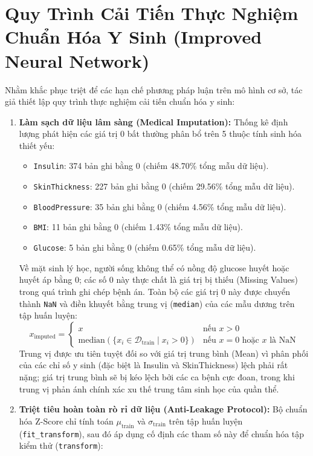 \documentclass[12pt,a4paper]{report}
\begin{document}
\section{Quy Trình Cải Tiến Thực Nghiệm Chuẩn Hóa Y Sinh (Improved Neural Network)}
Nhằm khắc phục triệt để các hạn chế phương pháp luận trên mô hình cơ sở, tác giả thiết lập quy trình thực nghiệm cải tiến chuẩn hóa y sinh:
\begin{enumerate}
    \item \textbf{Làm sạch dữ liệu lâm sàng (Medical Imputation):} Thống kê định lượng phát hiện các giá trị 0 bất thường phân bổ trên 5 thuộc tính sinh hóa thiết yếu:
    \begin{itemize}
        \item \texttt{Insulin}: 374 bản ghi bằng 0 (chiếm 48.70\% tổng mẫu dữ liệu).
        \item \texttt{SkinThickness}: 227 bản ghi bằng 0 (chiếm 29.56\% tổng mẫu dữ liệu).
        \item \texttt{BloodPressure}: 35 bản ghi bằng 0 (chiếm 4.56\% tổng mẫu dữ liệu).
        \item \texttt{BMI}: 11 bản ghi bằng 0 (chiếm 1.43\% tổng mẫu dữ liệu).
        \item \texttt{Glucose}: 5 bản ghi bằng 0 (chiếm 0.65\% tổng mẫu dữ liệu).
    \end{itemize}
    Về mặt sinh lý học, người sống không thể có nồng độ glucose huyết hoặc huyết áp bằng 0; các số 0 này thực chất là giá trị bị thiếu (Missing Values) trong quá trình ghi chép bệnh án. Toàn bộ các giá trị 0 này được chuyển thành \texttt{NaN} và điền khuyết bằng trung vị (\texttt{median}) của các mẫu dương trên tập huấn luyện:
    \begin{equation}
        x_{\text{imputed}} = \begin{cases} x & \text{nếu } x > 0 \\ \text{median}(\{x_i \in \mathcal{D}_{\text{train}} \mid x_i > 0\}) & \text{nếu } x = 0 \text{ hoặc } x \text{ là NaN} \end{cases}
    \end{equation}
    Trung vị được ưu tiên tuyệt đối so với giá trị trung bình (Mean) vì phân phối của các chỉ số y sinh (đặc biệt là Insulin và SkinThickness) lệch phải rất nặng; giá trị trung bình sẽ bị kéo lệch bởi các ca bệnh cực đoan, trong khi trung vị phản ánh chính xác xu thế trung tâm sinh học của quần thể.
    \item \textbf{Triệt tiêu hoàn toàn rò rỉ dữ liệu (Anti-Leakage Protocol):} Bộ chuẩn hóa Z-Score chỉ tính toán $\mu_{\text{train}}$ và $\sigma_{\text{train}}$ trên tập huấn luyện (\texttt{fit\_transform}), sau đó áp dụng cố định các tham số này để chuẩn hóa tập kiểm thử (\texttt{transform}):

\end{enumerate}
\end{document}
